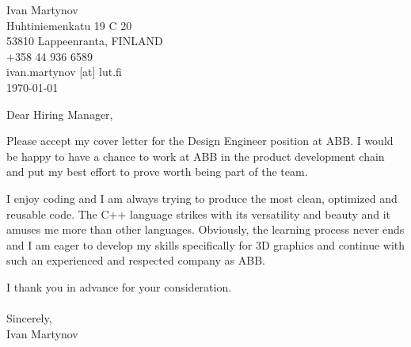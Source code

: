 \documentclass[]{article}
\begin{document}
\begin{flushright}
	Ivan Martynov\\
  Huhtiniemenkatu 19 C 20\\
	53810 Lappeenranta, FINLAND\\
	+358 44 936 6589\\
	ivan.martynov [at] lut.fi\\
	\today
\end{flushright}

\noindent
Dear Hiring Manager,
\bigskip

\noindent
Please accept my cover letter for the Design Engineer position at ABB.
I would be happy to have a chance to work at ABB in the product development
chain and put my best effort to prove worth being part of the team.

I enjoy coding and I am always trying to produce the most clean, optimized and
reusable code. The C++ language strikes with its versatility and beauty and it
amuses me more than other languages. Obviously, the learning process never ends
and I am eager to develop my skills specifically for 3D graphics and continue
with such an experienced and respected company as ABB.

\noindent
I thank you in advance for your consideration.\\\ \\

\noindent Sincerely,\\
Ivan Martynov
\end{document}
